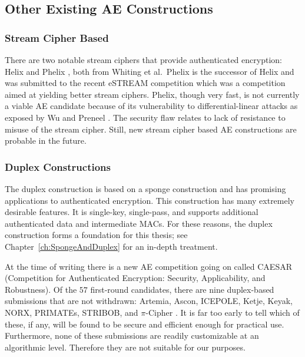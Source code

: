 \subsection{Other Existing AE Constructions}
\subsubsection{Stream Cipher Based}
There are two notable stream ciphers that provide authenticated encryption: Helix \cite{Whiting2005_Helix} and Phelix \cite{Whiting2005_Phelix}, both from Whiting et al.\ Phelix is the successor of Helix and was submitted to the recent eSTREAM competition which was a competition aimed at yielding better stream ciphers.
Phelix, though very fast, is not currently a viable AE candidate because of its vulnerability to differential-linear attacks as exposed by Wu and Preneel \cite{Wu2007_PhelixAttack}.
The security flaw relates to lack of resistance to misuse of the stream cipher.
Still, new stream cipher based AE constructions are probable in the future.

\subsubsection{Duplex Constructions}
The duplex construction is based on a sponge construction and has promising applications to authenticated encryption.
This construction has many extremely desirable features.
It is single-key, single-pass, and supports additional authenticated data and intermediate MACs.
For these reasons, the duplex construction forms a foundation for this thesis; see Chapter~\ref{ch:SpongeAndDuplex} for an in-depth treatment.

At the time of writing there is a new AE competition going on called CAESAR (Competition for Authenticated Encryption: Security, Applicability, and Robustness). 
Of the $57$ first-round candidates, there are nine duplex-based submissions that are not withdrawn:
Artemia, Ascon, ICEPOLE, Ketje, Keyak, NORX, PRIMATEs, STRIBOB, and $\pi$-Cipher \cite{Bernstein2014_CAESAR_Submissions}.
It is far too early to tell which of these, if any, will be found to be secure and efficient enough for practical use.
Furthermore, none of these submissions are readily customizable at an algorithmic level.
Therefore they are not suitable for our purposes.

